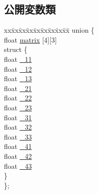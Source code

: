 \subsection*{公開変数類}
\begin{DoxyCompactItemize}
\item 
\begin{tabbing}
xx\=xx\=xx\=xx\=xx\=xx\=xx\=xx\=xx\=\kill
union \{\\
\>float \mbox{\hyperlink{struct_math_1_1_matrix4x3_af135478d681c61993cc9c29e9dfbd125}{matrix}} \mbox{[}4\mbox{]}\mbox{[}3\mbox{]}\\
\>struct \{\\
\>\>float \mbox{\hyperlink{struct_math_1_1_matrix4x3_a72648bf1cf6856fa99c205d902cba390}{\_11}}\\
\>\>float \mbox{\hyperlink{struct_math_1_1_matrix4x3_ac83564972ce72844caf9c7894dc863a4}{\_12}}\\
\>\>float \mbox{\hyperlink{struct_math_1_1_matrix4x3_af5c90862e0c5ed47a13470e81f56396c}{\_13}}\\
\>\>float \mbox{\hyperlink{struct_math_1_1_matrix4x3_af9e33fdfd3de0109c311aa164baa92d1}{\_21}}\\
\>\>float \mbox{\hyperlink{struct_math_1_1_matrix4x3_aa0ff1abe5d3bf01bc453740e3a7fed9c}{\_22}}\\
\>\>float \mbox{\hyperlink{struct_math_1_1_matrix4x3_a5d0fbc09b193f59f7e7130a8781d7589}{\_23}}\\
\>\>float \mbox{\hyperlink{struct_math_1_1_matrix4x3_a329354e87f8add717b7b5e8399ee1791}{\_31}}\\
\>\>float \mbox{\hyperlink{struct_math_1_1_matrix4x3_a5439140c254d8f4f97aaabf845f28d83}{\_32}}\\
\>\>float \mbox{\hyperlink{struct_math_1_1_matrix4x3_a31a0d4dbf129a32eea90a858d8e4c396}{\_33}}\\
\>\>float \mbox{\hyperlink{struct_math_1_1_matrix4x3_a809630d3c2612be41c4decc594ad7117}{\_41}}\\
\>\>float \mbox{\hyperlink{struct_math_1_1_matrix4x3_a5986e77324549a139f2c0762cc609727}{\_42}}\\
\>\>float \mbox{\hyperlink{struct_math_1_1_matrix4x3_af7df8e1b1cce9c87542c92b8fea4d693}{\_43}}\\
\>\} \\
\}; \\

\end{tabbing}\end{DoxyCompactItemize}


